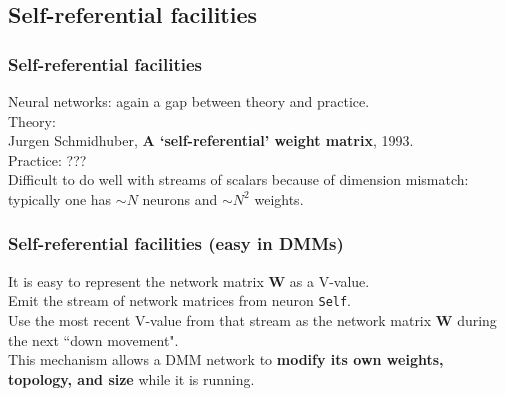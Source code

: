 \documentclass{beamer}
\newcommand{\msmagenta}[1]{{\color{mymagenta} #1}}
\begin{document}
\subsection{Self-referential facilities}



\begin{frame}

  \frametitle{\msmagenta{Self-referential facilities}}

Neural networks: again a gap between theory and practice.\\[4ex]


Theory:\\ Jurgen Schmidhuber, {\bf A `self-referential' weight matrix}, 1993.\\[4ex]


Practice: ???\\[4ex]

Difficult to do well with streams of scalars because of dimension mismatch:
typically one has $\sim N$ neurons and $\sim N^2$ weights.





\end{frame}


\begin{frame}

  \frametitle{\msmagenta{Self-referential facilities (easy in DMMs)}}

It is easy to represent the network matrix {\bf W} as a V-value.\\[3ex]

Emit the stream
of network matrices from neuron {\tt Self}.\\[3ex]

Use the most recent V-value from that stream
as the network matrix {\bf W} during the
next ``down movement".\\[3ex]

This mechanism allows a DMM network to 
{\bf modify its own weights, topology, and size}
while it is running.

\end{frame}
\end{document}
